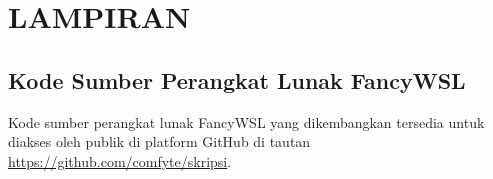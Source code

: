 \chapter*{LAMPIRAN}
\section{Kode Sumber Perangkat Lunak FancyWSL}

Kode sumber perangkat lunak FancyWSL yang dikembangkan tersedia untuk diakses oleh publik di platform GitHub di tautan \href{https://github.com/comfyte/skripsi}{https://github.com/comfyte/skripsi}.
